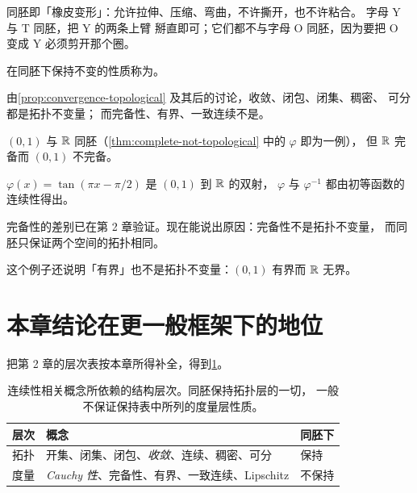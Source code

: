 \begin{intuition}
  同胚即「橡皮变形」：允许拉伸、压缩、弯曲，不许撕开，也不许粘合。
  字母 \(\mathrm{Y}\) 与 \(\mathrm{T}\) 同胚，把 \(\mathrm{Y}\) 的两条上臂
  掰直即可；它们都不与字母 \(\mathrm{O}\) 同胚，因为要把 \(\mathrm{O}\)
  变成 \(\mathrm{Y}\) 必须剪开那个圈。
\end{intuition}

\begin{definition}[拓扑不变量]
  \label{def:topological-invariant}
  在同胚下保持不变的性质称为。
\end{definition}

由\cref{prop:convergence-topological} 及其后的讨论，收敛、闭包、闭集、稠密、
可分都是拓扑不变量；
而完备性、有界、一致连续不是。

\begin{example}
  \label{ex:homeo-not-complete}
  \((0,1)\) 与 \(\mathbb{R}\) 同胚（\cref{thm:complete-not-topological} 中的 \(\varphi\) 即为一例），
  但 \(\mathbb{R}\) 完备而 \((0,1)\) 不完备。
  \begin{worked}
    \(\varphi(x) = \tan(\pi x - \pi/2)\) 是 \((0,1)\) 到 \(\mathbb{R}\) 的双射，
    \(\varphi\) 与 \(\varphi^{-1}\) 都由初等函数的连续性得出。

    完备性的差别已在第 2 章验证。现在能说出原因：完备性不是拓扑不变量，
    而同胚只保证两个空间的拓扑相同。

    这个例子还说明「有界」也不是拓扑不变量：\((0,1)\) 有界而 \(\mathbb{R}\) 无界。
  \end{worked}
\end{example}

\section{本章结论在更一般框架下的地位}
\label{sec:ch3-outlook}

把第 2 章的层次表按本章所得补全，得到\cref{tab:ch3-structure}。

\begin{table}[htbp]
  \centering
  \caption{连续性相关概念所依赖的结构层次。同胚保持拓扑层的一切，
    一般不保证保持表中所列的度量层性质。}
  \label{tab:ch3-structure}
  \begin{tabular}{@{}lll@{}}
    \toprule
    层次 & 概念 & 同胚下 \\
    \midrule
    拓扑 & 开集、闭集、闭包、\emph{收敛}、连续、稠密、可分 & 保持 \\
    度量 & \emph{Cauchy 性}、完备性、有界、一致连续、Lipschitz & 不保持 \\
    \bottomrule
  \end{tabular}
\end{table}

